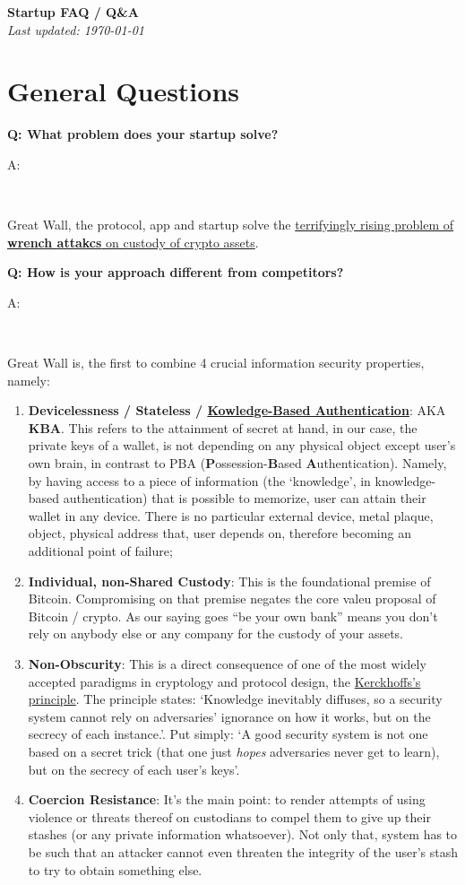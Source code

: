\documentclass[12pt,a4paper]{article}
\newenvironment{question}[1]{%
  \vspace{0.8em}\noindent\textbf{Q: #1}\par
  \vspace{0.2em}\noindent\begin{itshape}A:\end{itshape}~%
}{\vspace{0.8em}}
\newcommand{\theproblem}{https://x.com/search?q=jameson\%20lopp\%20wrench\%20attack&src=typed_query&f=live}
\newcommand{\kba}{https://en.wikipedia.org/wiki/Knowledge-based_authentication}
\newcommand{\kprinciple}{https://en.wikipedia.org/wiki/Kerckhoffs's_principle}
\begin{document}
\begin{center}
  {\LARGE \textbf{Startup FAQ / Q\&A}}\\[0.3em]
  \textit{Last updated: \today}
\end{center}

\section{General Questions}

\begin{question}{What problem does your startup solve?}
Great Wall, the protocol, app and startup solve the \href{\theproblem}{terrifyingly rising problem of \textbf{wrench attakcs} on custody of crypto assets}.
\end{question}

\begin{question}{How is your approach different from competitors?}
Great Wall is, the first to combine 4 crucial information security properties, namely:
  \begin{enumerate}
    \item \textbf{Devicelessness / Stateless / \href{\kba}{Kowledge-Based Authentication}}: AKA \textbf{KBA}. This refers to the attainment of secret at hand, in our case, the private keys of a wallet, is not depending on any physical object except user's own brain, in contrast to PBA (\textbf{P}ossession-\textbf{B}ased \textbf{A}uthentication). Namely, by having access to a piece of information (the `knowledge', in knowledge-based authentication) that is possible to memorize, user can attain their wallet in any device. There is no particular external device, metal plaque, object, physical address that, user depends on, therefore becoming an additional point of failure;
    \item \textbf{Individual, non-Shared Custody}: This is the foundational premise of Bitcoin. Compromising on that premise negates the core valeu proposal of Bitcoin / crypto. As our saying goes ``be your own bank'' means you don't rely on anybody else or any company for the custody of your assets.
    \item \textbf{Non-Obscurity}: This is a direct consequence of one of the most widely accepted paradigms in cryptology and protocol design, the \href{\kprinciple}{Kerckhoffs's principle}. The principle states: `Knowledge inevitably diffuses, so a security system cannot rely on adversaries' ignorance on how it works, but on the secrecy of each instance.'. Put simply: `A good security system is not one based on a secret trick (that one just \textit{hopes} adversaries never get to learn), but on the secrecy of each user's keys'.
    \item \textbf{Coercion Resistance}: It's the main point: to render attempts of using violence or threats thereof on custodians to compel them to give up their stashes (or any private information whatsoever). Not only that, system has to be such that an attacker cannot even threaten the integrity of the user's stash to try to obtain something else.
  \end{enumerate}
\end{question}
\end{document}
